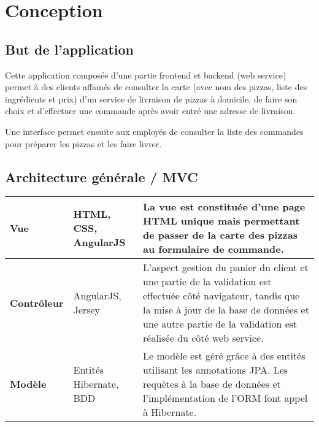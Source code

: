 
\section{Conception}

\subsection{But de l'application}

Cette application composée d'une partie frontend et backend (web service)
permet à des clients affamés de consulter la carte (avec nom des pizzas, liste des ingrédients
et prix) d'un service de livraison de pizzas
à domicile, de faire son choix et d'effectuer une commande après avoir entré une adresse de livraison.

Une interface permet ensuite aux employés de consulter la liste des commandes pour préparer
les pizzas et les faire livrer.

\subsection{Architecture générale / MVC}

\begin{tabular}{| l l p{11cm} |}
\hline
\bf Vue & HTML, CSS, AngularJS & La vue est constituée d'une page HTML unique mais permettant de passer
                                 de la carte des pizzas au formulaire de commande. \\
\hline
\bf Contrôleur & AngularJS, Jersey & L'aspect gestion du panier du client et une partie de la validation
                                     est effectuée côté navigateur, tandis que la mise à jour de la base
                                     de données et une autre partie de la validation est réalisée
                                     du côté web service. \\
\hline
\bf Modèle & Entités Hibernate, BDD & Le modèle est géré grâce à des entités utilisant les annotations JPA.
                                      Les requêtes à la base de données et l'implémentation de l'ORM
                                      font appel à Hibernate. \\
    \hline
\end{tabular}


